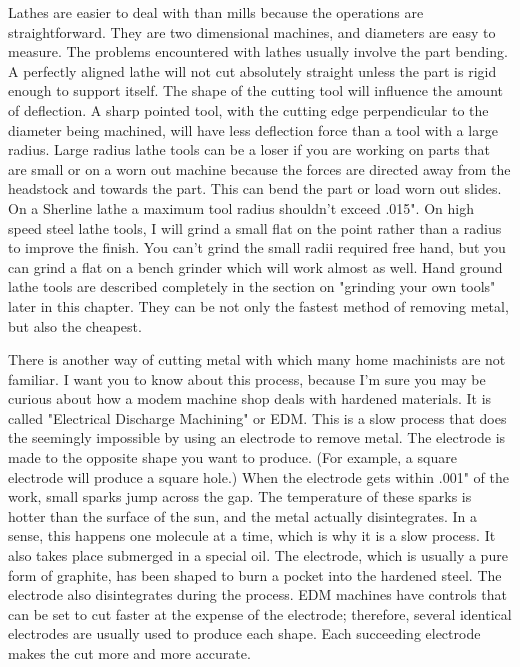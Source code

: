 
Lathes are easier to deal with than mills because the operations are
straightforward. They are two dimensional machines, and diameters are easy to
measure. The problems encountered with lathes usually involve the part bending.
A perfectly aligned lathe will not cut absolutely straight unless the part is
rigid enough to support itself. The shape of the cutting tool will influence the
amount of deflection. A sharp pointed tool, with the cutting edge perpendicular
to the diameter being machined, will have less deflection force than a tool with
a large radius. Large radius lathe tools can be a loser if you are working on
parts that are small or on a worn out machine because the forces are directed
away from the headstock and towards the part. This can bend the part or load
worn out slides. On a Sherline lathe a maximum tool radius shouldn't exceed
.015". On high speed steel lathe tools, I will grind a small flat on the point
rather than a radius to improve the finish. You can't grind the small radii
required free hand, but you can grind a flat on a bench grinder which will work
almost as well. Hand ground lathe tools are described completely in the section
on "grinding your own tools" later in this chapter. They can be not only the
fastest method of removing metal, but also the cheapest.


There is another way of cutting metal with which many home machinists are not
familiar. I want you to know about this process, because I'm sure you may be
curious about how a modem machine shop deals with hardened materials. It is
called "Electrical Discharge Machining" or EDM. This is a slow process that does
the seemingly impossible by using an electrode to remove metal. The electrode is
made to the opposite shape you want to produce. (For example, a square electrode
will produce a square hole.) When the electrode gets within .001" of the work,
small sparks jump across the gap. The temperature of these sparks is hotter than
the surface of the sun, and the metal actually disintegrates. In a sense, this
happens one molecule at a time, which is why it is a slow process. It also takes
place submerged in a special oil. The electrode, which is usually a pure form of
graphite, has been shaped to burn a pocket into the hardened steel. The
electrode also disintegrates during the process. EDM machines have controls that
can be set to cut faster at the expense of the electrode; therefore, several
identical electrodes are usually used to produce each shape. Each succeeding
electrode makes the cut more and more accurate.

